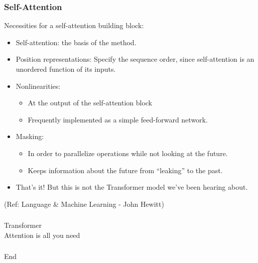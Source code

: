 \begin{frame}[fragile]\frametitle{Self-Attention}

Necessities for a self-attention building block:

\begin{itemize}
\item Self-attention:
the basis of the method.
\item Position representations:
Specify the sequence order, since self-attention is an unordered function of its  inputs.
\item Nonlinearities:
\begin{itemize}
\item At the output of the self-attention block
\item Frequently implemented as a simple feed-forward network.
\end{itemize}	 

\item Masking:
\begin{itemize}
\item In order to parallelize operations while not looking at the future.
\item Keeps information about the future from “leaking” to the past.
\end{itemize}	 

\item That’s it! But this is not the Transformer model we’ve been hearing about.


\end{itemize}	 

 
{\tiny (Ref: Language \& Machine Learning - John Hewitt)}
\end{frame}

\begin{frame}[fragile]\frametitle{}
\begin{center}
{\Large Transformer \\ \small Attention is all you need}
\end{center}
\end{frame}



\begin{frame}[fragile]\frametitle{}
\begin{center}
{\Large End}
\end{center}
\end{frame}


